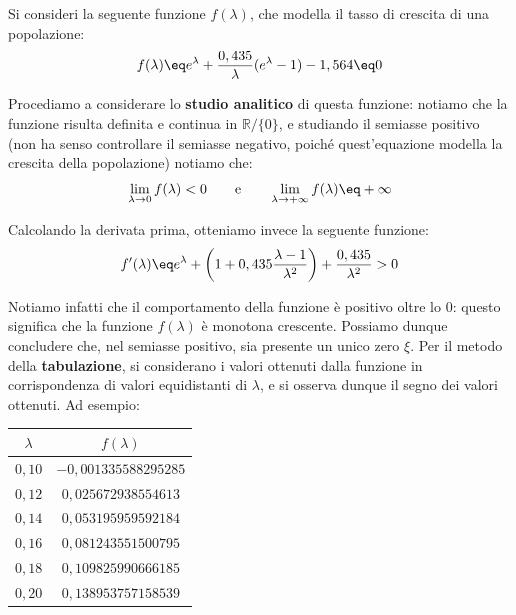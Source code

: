 \begin{example}
    Si consideri la seguente funzione $f(\lambda)$, che modella il tasso di crescita di una popolazione:
    \[ f(\lambda) \eq e^{\lambda} + \frac{0,435}{\lambda} (e^{\lambda} - 1) - 1,564 \eq 0 \]

    Procediamo a considerare lo \textbf{studio analitico} di questa funzione: notiamo che la funzione risulta definita e continua in $\mathbb{R} / \{0\}$, e studiando il semiasse positivo (non ha senso controllare il semiasse negativo, poiché quest'equazione modella la crescita della popolazione) notiamo che:
    \[ \lim_{\lambda \to 0} f(\lambda) < 0 \quad\quad \text{e} \quad\quad \lim_{\lambda \to +\infty} f(\lambda) \eq +\infty \]

    Calcolando la derivata prima, otteniamo invece la seguente funzione:
    \[ f'(\lambda) \eq e^{\lambda} + \left( 1 + 0,435 \frac{\lambda - 1}{\lambda^2} \right) + \frac{0,435}{\lambda^2} > 0 \]

    Notiamo infatti che il comportamento della funzione è positivo oltre lo 0: questo significa che la funzione $f(\lambda)$ è monotona crescente. Possiamo dunque concludere che, nel semiasse positivo, sia presente un unico zero $\xi$.
    \nwl
    Per il metodo della \textbf{tabulazione}, si considerano i valori ottenuti dalla funzione in corrispondenza di valori equidistanti di $\lambda$, e si osserva dunque il segno dei valori ottenuti. Ad esempio:
    \begin{center}
        \begin{tabular}{c|c}
            $\lambda$ & $f(\lambda)$ \\
            \hline
            $0,10$ & $-0,001335588295285$ \\
            $0,12$ & $0,025672938554613$ \\
            $0,14$ & $0,053195959592184$ \\
            $0,16$ & $0,081243551500795$ \\
            $0,18$ & $0,109825990666185$ \\
            $0,20$ & $0,138953757158539$ \\
        \end{tabular}
    \end{center}


\end{example}
